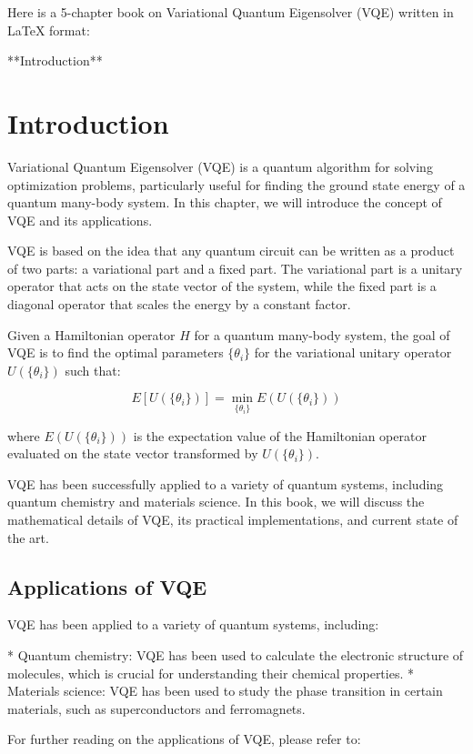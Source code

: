 Here is a 5-chapter book on Variational Quantum Eigensolver (VQE) written in LaTeX format:

**Introduction**

\chapter{Introduction}

Variational Quantum Eigensolver (VQE) is a quantum algorithm for solving optimization problems, particularly useful for finding the ground state energy of a quantum many-body system. In this chapter, we will introduce the concept of VQE and its applications.

VQE is based on the idea that any quantum circuit can be written as a product of two parts: a variational part and a fixed part. The variational part is a unitary operator that acts on the state vector of the system, while the fixed part is a diagonal operator that scales the energy by a constant factor.

Given a Hamiltonian operator $H$ for a quantum many-body system, the goal of VQE is to find the optimal parameters $\{ \theta_i \}$ for the variational unitary operator $U(\{\theta_i\})$ such that:

$$E[U(\{\theta_i\})] = \min_{\{\theta_i\}} E(U(\{\theta_i\}))$$

where $E(U(\{\theta_i\}))$ is the expectation value of the Hamiltonian operator evaluated on the state vector transformed by $U(\{\theta_i\})$.

VQE has been successfully applied to a variety of quantum systems, including quantum chemistry and materials science. In this book, we will discuss the mathematical details of VQE, its practical implementations, and current state of the art.

\section{Applications of VQE}

VQE has been applied to a variety of quantum systems, including:

* Quantum chemistry: VQE has been used to calculate the electronic structure of molecules, which is crucial for understanding their chemical properties.
* Materials science: VQE has been used to study the phase transition in certain materials, such as superconductors and ferromagnets.

For further reading on the applications of VQE, please refer to:

